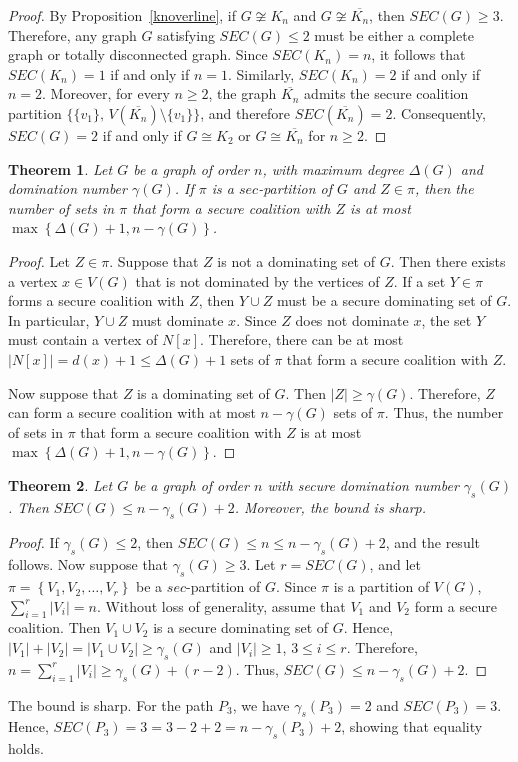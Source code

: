 \documentclass[12pt]{article}
\newtheorem{theorem}{Theorem}[section]
\begin{document}
\begin{proof}
By Proposition~\ref{knoverline}, if
$G\not\cong K_n$ and $G\not\cong \overline{K_n}$,
then $SEC(G)\ge 3$. Therefore, any graph $G$ satisfying $SEC(G)\le 2$ must be either a complete graph or totally disconnected graph. Since $SEC(K_n)=n$, it follows that $SEC(K_n)=1$ if and only if $n=1$. Similarly, $SEC(K_n)=2$ if and only if $n=2$. Moreover, for every $n\ge 2$, the graph $\overline{K_n}$ admits the secure coalition partition
$\bigl\{\{v_1\},\,V(\overline{K_n})\setminus\{v_1\}\bigr\}$,
and therefore $SEC(\overline{K_n})=2$.
Consequently, $SEC(G)=2$ if and only if $G\cong K_2$ or $G\cong \overline{K_n}$ for $n\ge 2$.
\end{proof}
\begin{theorem}
Let $G$ be a graph of order $n$, with maximum degree $\Delta(G)$ and domination number $\gamma(G)$. If $\pi$ is a $sec$-partition of $G$ and $Z\in \pi$, then the number of sets in $\pi$ that form a secure coalition with $Z$ is at most $\max\left\{\Delta(G)+1, n-\gamma(G)\right\}$.
\end{theorem}
\begin{proof}
Let $Z\in \pi$. Suppose that $Z$ is not a dominating set of $G$. Then there exists a vertex $x\in V(G)$ that is not dominated by the vertices of $Z$. If a set $Y\in \pi$ forms a secure coalition with $Z$, then $Y\cup Z$ must be a secure dominating set of $G$. In particular, $Y\cup Z$ must dominate $x$. Since $Z$ does not dominate $x$, the set $Y$ must contain a vertex of $N[x]$. Therefore, there can be at most $|N[x]|=d(x)+1\le \Delta(G)+1$ sets of $\pi$ that form a secure coalition with $Z$.\par
Now suppose that $Z$ is a dominating set of $G$. Then
$|Z|\ge \gamma(G)$.
Therefore, $Z$ can form a secure coalition with at most $n-\gamma(G)$ sets of $\pi$.
Thus, the number of sets in $\pi$ that form a secure coalition with $Z$ is at most $\max\left\{\Delta(G)+1, n-\gamma(G)\right\}$.
\end{proof}
\begin{theorem}
Let $G$ be a graph of order $n$ with secure domination number $\gamma_s(G)$. Then $SEC(G)\le n-\gamma_s(G)+2$.
Moreover, the bound is sharp.
\end{theorem}
\begin{proof}
If $\gamma_s(G)\le 2$, then $SEC(G)\le n\le n-\gamma_s(G)+2$,
and the result follows.
Now suppose that $\gamma_s(G)\ge 3$. Let $r=SEC(G)$,
and let $\pi=\left\{V_1,V_2,\ldots,V_r\right\}$ be a $sec$-partition of $G$. Since $\pi$ is a partition of $V(G)$, $\sum_{i=1}^{r}|V_i|=n$. Without loss of generality, assume that $V_1$ and $V_2$ form a secure coalition. Then $V_1\cup V_2$ is a secure dominating set of $G$. Hence, $|V_1|+|V_2|=|V_1\cup V_2| \ge \gamma_s(G)$ and $|V_i|\ge 1$, $3\le i\le r$. Therefore, $n=\sum_{i=1}^{r}|V_i| \ge \gamma_s(G)+(r-2)$.
Thus, $SEC(G)\le n-\gamma_s(G)+2$.
\end{proof}
The bound is sharp. For the path $P_3$, we have
$\gamma_s(P_3)=2$ and $SEC(P_3)=3$.
Hence, $SEC(P_3)=3=3-2+2=n-\gamma_s(P_3)+2$, showing that equality holds.
\end{document}
